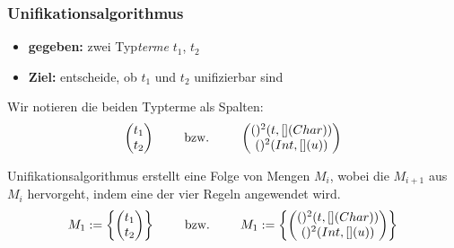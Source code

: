 \documentclass{beamer}
\begin{document}
\begin{frame}\frametitle{Unifikationsalgorithmus}
	\small
	\begin{itemize}
		\item \textbf{gegeben:} zwei Typ\textit{terme} $t_1$, $t_2$ 
		\item \textbf{Ziel:} entscheide, ob $t_1$ und $t_2$ unifizierbar sind
	\end{itemize}
	
	Wir notieren die beiden Typterme als Spalten:
	\begin{equation*}
		\begin{pmatrix}
			t_1 \\ t_2
		\end{pmatrix} 
		\qquad \text{ bzw. } \qquad 
		\begin{pmatrix}
			()^2(t, [](Char)) \\ ()^2(Int, [](u))
		\end{pmatrix} 
	\end{equation*}
	
	Unifikationsalgorithmus erstellt eine Folge von Mengen $M_i$, wobei die $M_{i+1}$ aus $M_i$ hervorgeht, indem eine der vier Regeln angewendet wird.
	\begin{equation*}
		M_1 \mathrel{:=} \left\{ \begin{pmatrix}
			t_1 \\ t_2
		\end{pmatrix} \right\}
		\qquad \text{ bzw. } \qquad 
		M_1 \mathrel{:=} \left\{ \begin{pmatrix}
			()^2(t, [](Char)) \\ ()^2(Int, [](u))
		\end{pmatrix} \right\}
	\end{equation*}
\end{frame}
\end{document}
